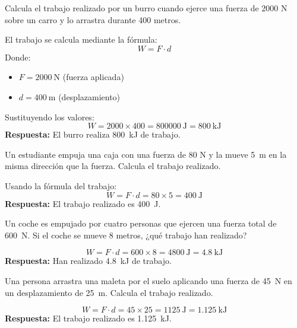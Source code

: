\begin{exercise}
    Calcula el trabajo realizado por un burro cuando ejerce una fuerza de 2000 N sobre un carro y lo arrastra durante 400 metros.
    \begin{solu}
        El trabajo se calcula mediante la fórmula:
        \[
            W = F \cdot d
        \]
        Donde:
        \begin{itemize}
            \item $F = \qty{2000}{\newton}$ (fuerza aplicada)
            \item $d = \qty{400}{\metre}$ (desplazamiento)
        \end{itemize}
        Sustituyendo los valores:
        \[
            W = 2000 \times 400 = \qty{800000}{\joule} = \qty{800}{\kilo\joule}
        \]
        \textbf{Respuesta:} El burro realiza \qty{800}{\kilo\joule} de trabajo.
    \end{solu}
\end{exercise}

\begin{exercise}
    Un estudiante empuja una caja con una fuerza de 80 N y la mueve \qty{5}{\metre} en la misma dirección que la fuerza. Calcula el trabajo realizado.
    \begin{solu}
        Usando la fórmula del trabajo:
        \[
            W = F \cdot d = 80 \times 5 = \qty{400}{\joule}
        \]
        \textbf{Respuesta:} El trabajo realizado es \qty{400}{\joule}.
    \end{solu}
\end{exercise}

\begin{exercise}
    Un coche es empujado por cuatro personas que ejercen una fuerza total de \qty{600}{\newton}. Si el coche se mueve 8 metros, ¿qué trabajo han realizado?
    \begin{solu}

        \[
            W = F \cdot d = 600 \times 8 = \qty{4800}{\joule} = \qty{4.8}{\kilo\joule}
        \]
        \textbf{Respuesta:} Han realizado \qty{4.8}{\kilo\joule} de trabajo.
    \end{solu}
\end{exercise}

\begin{exercise}
    Una persona arrastra una maleta por el suelo aplicando una fuerza de \qty{45}{\newton} en un desplazamiento de \qty{25}{\metre}. Calcula el trabajo realizado.
    \begin{solu}
        \[
            W = F \cdot d = 45 \times 25 = \qty{1125}{\joule} = \qty{1.125}{\kilo\joule}
        \]
        \textbf{Respuesta:} El trabajo realizado es \qty{1.125}{\kilo\joule}.
    \end{solu}
\end{exercise}

